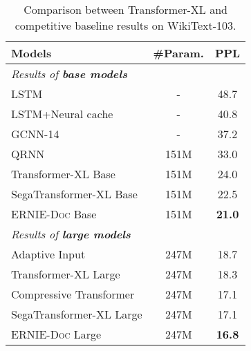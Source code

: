 \documentclass[11pt,a4paper]{article}
\newcommand{\mname}{\textsc{ERNIE-Doc}\xspace}
\begin{document}
\begin{table}[]
\small
\setlength\tabcolsep{2pt}
\begin{tabular}{lcc}
\hline \hline
\textbf{Models}                             & \multicolumn{1}{l}{\#Param.} & \multicolumn{1}{l}{PPL} \\ \hline
{\textit{ Results of \textbf{ base models}}}          & \multicolumn{1}{l}{}         & \multicolumn{1}{l}{}    \\
LSTM \citep{grave2016improving}                               & -                            & 48.7                    \\
LSTM+Neural cache \citep{grave2016improving}                   & -                            & 40.8                    \\
GCNN-14 \citep{dauphin2017language}                           & -                            & 37.2                    \\
QRNN \citep{merity2018analysis}                              & 151M                         & 33.0                    \\
Transformer-XL Base \citep{transformer_xl}         & 151M                         & 24.0                    \\
SegaTransformer-XL Base \citep{bai2020segabert}     & 151M                         & 22.5                    \\
\mname Base & 151M                         & \textbf{21.0}           \\ \hline \hline
{\textit{ Results of \textbf{ large models}}}         &                              &                         \\
Adaptive Input \citep{baevski2018adaptive}                    & 247M                         & 18.7                    \\
Transformer-XL Large \citep{transformer_xl}       & 247M                         & 18.3                    \\
Compressive Transformer \citep{compressive_transformer}    & 247M                         & 17.1                    \\
SegaTransformer-XL Large \citep{bai2020segabert}   & 247M                         & 17.1                    \\
\mname Large & 247M                         & \textbf{16.8}                    \\ \hline
\end{tabular}
\caption{Comparison between Transformer-XL and competitive baseline results on WikiText-103.}
\label{tb: lm results}
\vspace{-0.5cm}
\end{table}
\end{document}
